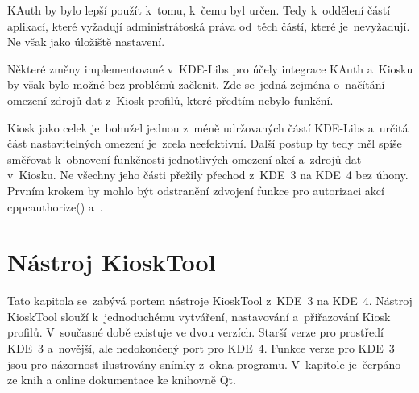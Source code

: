 KAuth by bylo lepší použít k~tomu, k~čemu byl určen. Tedy k~oddělení částí aplikací, které vyžadují administrátoská práva od~těch částí, které je~nevyžadují. Ne však jako úložiště nastavení.

Některé změny implementované v~KDE-Libs pro účely integrace KAuth a~Kiosku by však bylo možné bez problémů začlenit. Zde se~jedná zejména o~načítání omezení zdrojů dat z~Kiosk profilů, které předtím nebylo funkční.

Kiosk jako celek je~bohužel jednou z~méně udržovaných částí KDE-Libs a~určitá část nastavitelných omezení je~zcela neefektivní. Další postup by tedy měl spíše směřovat k~obnovení funkčnosti jednotlivých omezení akcí a~zdrojů dat v~Kiosku.  Ne všechny jeho části přežily přechod z~KDE~3 na KDE~4 bez úhony. Prvním krokem by mohlo být odstranění zdvojení funkce pro autorizaci akcí cppc{authorize()} a~.

\chapter{Nástroj KioskTool}
Tato kapitola se~zabývá portem nástroje KioskTool z~KDE~3 na KDE~4. Nástroj KioskTool slouží k~jednoduchému vytváření, nastavování a~přiřazování Kiosk profilů. V~současné době existuje ve dvou verzích. Starší verze pro prostředí KDE~3 a~novější, ale nedokončený port pro KDE~4. Funkce verze pro KDE~3 jsou pro názornost ilustrovány snímky z~okna programu. V~kapitole je~čerpáno ze knih \cite{StarchQt4,Ezust} a online dokumentace ke knihovně Qt\cite{nokiaQt}.

